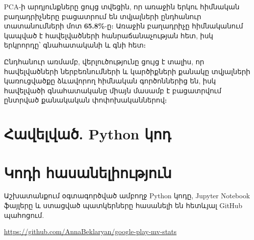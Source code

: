 \documentclass[11pt]{article}
\begin{document}
PCA-ի արդյունքները ցույց տվեցին, որ առաջին երկու հիմնական բաղադրիչները բացատրում են տվյալների ընդհանուր տատանումների մոտ \textbf{65.8\%}-ը։ Առաջին բաղադրիչը հիմնականում կապված է հավելվածների հանրաճանաչության հետ, իսկ երկրորդը՝ գնահատականի և գնի հետ։

Ընդհանուր առմամբ, վերլուծությունը ցույց է տալիս, որ հավելվածների ներբեռնումների և կարծիքների քանակը տվյալների կառուցվածքը ձևավորող հիմնական գործոններից են, իսկ հավելվածի գնահատականը միայն մասամբ է բացատրվում ընտրված քանակական փոփոխականներով։

\appendix

\section{Հավելված. Python կոդ}



\section{Կոդի հասանելիություն}

Աշխատանքում օգտագործված ամբողջ Python կոդը, Jupyter Notebook ֆայլերը և ստացված պատկերները հասանելի են հետևյալ GitHub պահոցում.

\url{https://github.com/AnnaBeklaryan/google-play-mv-stats}
\end{document}
